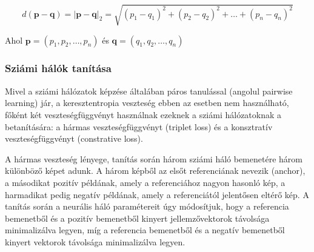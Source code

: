 
\[ d(\mathbf{p} - \mathbf{q}) = \lvert \mathbf{p} - \mathbf{q} \rvert_2 = \sqrt{(p_1 - q_1)^2 + (p_2 - q_2)^2 + \dots + (p_n - q_n)^2}\]

Ahol $\mathbf{p} = (p_1, p_2, \dots, p_n)$ és $\mathbf{q} = (q_1, q_2, \dots, q_n)$ 

\subsubsection{Sziámi hálók tanítása}

Mivel a sziámi hálózatok képzése általában páros tanulással (angolul pairwise learning) jár, a keresztentropia veszteség ebben az esetben nem használható, főként két veszteségfüggvényt használnak ezeknek a sziámi hálózatoknak a betanítására: a hármas veszteségfüggvényt (triplet loss) és a konsztratív veszteségfüggvényt (constrative loss).

A hármas veszteség lényege, tanítás során három sziámi háló bemenetére három különböző képet adunk. A három képből az elsőt referenciának nevezik (anchor), a másodikat pozitív példának, amely a referenciához nagyon hasonló kép, a harmadikat pedig negatív példának, amely a referenciától jelentősen eltérő kép. A tanítás során a neurális háló paramétereit úgy módosítjuk, hogy a referencia bemenetből és a pozitív bemenetből kinyert jellemzővektorok távolsága minimalizálva legyen, míg a referencia bemenetből és a negatív bemenetből kinyert vektorok távolsága minimalizálva legyen. \cite{facenet2015}



